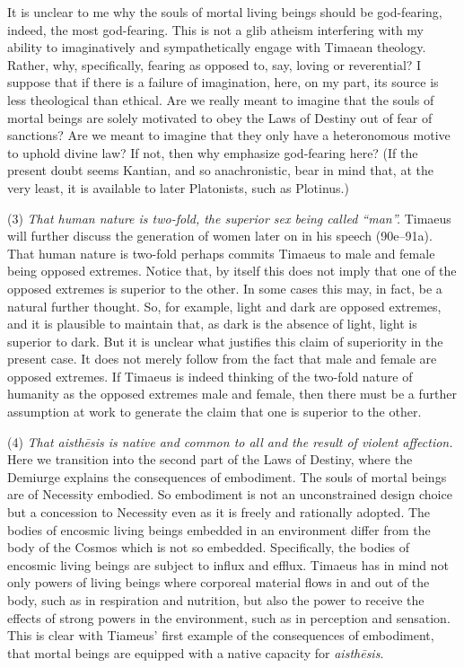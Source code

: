 It is unclear to me why the souls of mortal living beings should be god-fearing, indeed, the most god-fearing. This is not a glib atheism interfering with my ability to imaginatively and sympathetically engage with Timaean theology. Rather, why, specifically, fearing as opposed to, say, loving or reverential? I suppose that if there is a failure of imagination, here, on my part, its source is less theological than ethical. Are we really meant to imagine that the souls of mortal beings are solely motivated to obey the Laws of Destiny out of fear of sanctions? Are we meant to imagine that they only have a heteronomous motive to uphold divine law? If not, then why emphasize god-fearing here? (If the present doubt seems Kantian, and so anachronistic, bear in mind that, at the very least, it is available to later Platonists, such as Plotinus.)

(3) \emph{That human nature is two-fold, the superior sex being called ``man''.} Timaeus will further discuss the generation of women later on in his speech (90e--91a). That human nature is two-fold perhaps commits Timaeus to male and female being opposed extremes. Notice that, by itself this does not imply that one of the opposed extremes is superior to the other. In some cases this may, in fact, be a natural further thought. So, for example, light and dark are opposed extremes, and it is plausible to maintain that, as dark is the absence of light, light is superior to dark. But it is unclear what justifies this claim of superiority in the present case. It does not merely follow from the fact that male and female are opposed extremes. If Timaeus is indeed thinking of the two-fold nature of humanity as the opposed extremes male and female, then there must be a further assumption at work to generate the claim that one is superior to the other.

(4) \emph{That \emph{aisthēsis} is native and common to all and the result of violent affection.} Here we transition into the second part of the Laws of Destiny, where the Demiurge explains the consequences of embodiment. The souls of mortal beings are of Necessity embodied. So embodiment is not an unconstrained design choice but a concession to Necessity even as it is freely and rationally adopted. The bodies of encosmic living beings embedded in an environment differ from the body of the Cosmos which is not so embedded. Specifically, the bodies of encosmic living beings are subject to influx and efflux. Timaeus has in mind not only powers of living beings where corporeal material flows in and out of the body, such as in respiration and nutrition, but also the power to receive the effects of strong powers in the environment, such as in perception and sensation. This is clear with Tiameus' first example of the consequences of embodiment, that mortal beings are equipped with a native capacity for \emph{aisthēsis}.

